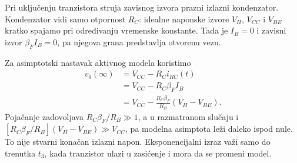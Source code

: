 Pri uključenju tranzistora struja zavisnog izvora prazni izlazni kondenzator. Kondenzator vidi samo otpornost $R_C$: idealne naponske izvore $V_H$, $V_{CC}$ i $V_{BE}$ kratko spajamo pri određivanju vremenske konstante. Tada je $I_B=0$ i zavisni izvor $\beta_FI_B=0$, pa njegova grana predstavlja otvorenu vezu.

Za asimptotski nastavak aktivnog modela koristimo
\[\begin{aligned}v_0(\infty)&=V_{CC}-R_Ci_{RC}(t)\\
&=V_{CC}-R_C\beta_FI_B\\
&=V_{CC}-\frac{R_C\beta_F}{R_B}(V_H-V_{BE}).\end{aligned}\]
Pojačanje zadovoljava $R_C\beta_F/R_B\gg1$, a u razmatranom slučaju i $[R_C\beta_F/R_B](V_H-V_{BE})\gg V_{CC}$, pa modelna asimptota leži daleko ispod nule. To nije stvarni konačan izlazni napon. Eksponencijalni izraz važi samo do trenutka $t_3$, kada tranzistor ulazi u zasićenje i mora da se promeni model.
